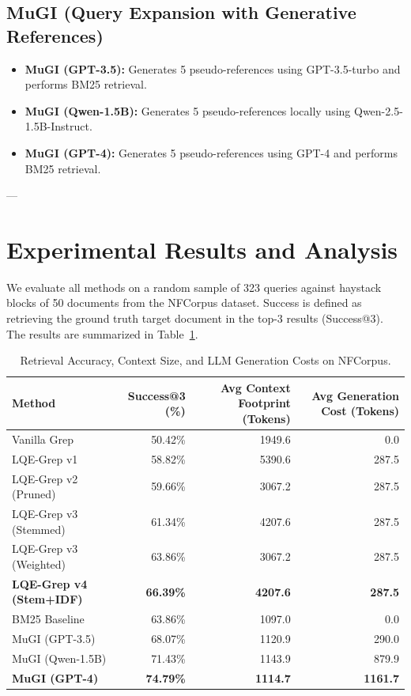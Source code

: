 \documentclass[11pt,a4paper]{article}
\begin{document}
\subsection{MuGI (Query Expansion with Generative References)}
\begin{itemize}
    \item \textbf{MuGI (GPT-3.5):} Generates 5 pseudo-references using GPT-3.5-turbo and performs BM25 retrieval.
    \item \textbf{MuGI (Qwen-1.5B):} Generates 5 pseudo-references locally using Qwen-2.5-1.5B-Instruct.
    \item \textbf{MuGI (GPT-4):} Generates 5 pseudo-references using GPT-4 and performs BM25 retrieval.
\end{itemize}

---

\section{Experimental Results and Analysis}

We evaluate all methods on a random sample of 323 queries against haystack blocks of 50 documents from the NFCorpus dataset. Success is defined as retrieving the ground truth target document in the top-3 results (Success@3). The results are summarized in Table~\ref{tab:results}.

\begin{table}[htbp]
\centering
\small
\begin{tabular}{lrrr}
\toprule
\textbf{Method} & \textbf{Success@3 (\%)} & \textbf{Avg Context Footprint (Tokens)} & \textbf{Avg Generation Cost (Tokens)} \\
\midrule
Vanilla Grep & 50.42\% & 1949.6 & 0.0 \\
LQE-Grep v1 & 58.82\% & 5390.6 & 287.5 \\
LQE-Grep v2 (Pruned) & 59.66\% & 3067.2 & 287.5 \\
LQE-Grep v3 (Stemmed) & 61.34\% & 4207.6 & 287.5 \\
LQE-Grep v3 (Weighted) & 63.86\% & 3067.2 & 287.5 \\
\textbf{LQE-Grep v4 (Stem+IDF)} & \textbf{66.39\%} & \textbf{4207.6} & \textbf{287.5} \\
\midrule
BM25 Baseline & 63.86\% & 1097.0 & 0.0 \\
MuGI (GPT-3.5) & 68.07\% & 1120.9 & 290.0 \\
MuGI (Qwen-1.5B) & 71.43\% & 1143.9 & 879.9 \\
\textbf{MuGI (GPT-4)} & \textbf{74.79\%} & \textbf{1114.7} & \textbf{1161.7} \\
\bottomrule
\end{tabular}
\caption{Retrieval Accuracy, Context Size, and LLM Generation Costs on NFCorpus.}
\label{tab:results}
\end{table}
\end{document}
